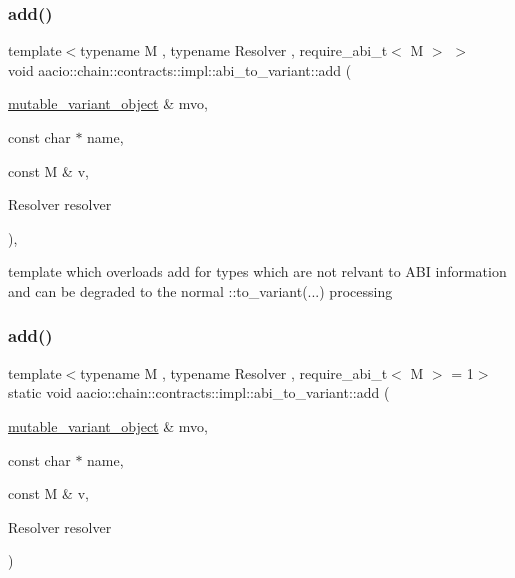 \subsubsection{\texorpdfstring{add()}{add()}\hspace{0.1cm}{\footnotesize\ttfamily [1/5]}}
{\footnotesize\ttfamily template$<$typename M , typename Resolver , require\+\_\+abi\+\_\+t$<$ M $>$ $>$ \\
void aacio\+::chain\+::contracts\+::impl\+::abi\+\_\+to\+\_\+variant\+::add (\begin{DoxyParamCaption}\item[{\mbox{\hyperlink{classfc_1_1mutable__variant__object}{mutable\+\_\+variant\+\_\+object}} \&}]{mvo,  }\item[{const char $\ast$}]{name,  }\item[{const M \&}]{v,  }\item[{Resolver}]{resolver }\end{DoxyParamCaption})\hspace{0.3cm}{\ttfamily [inline]}, {\ttfamily [static]}}

template which overloads add for types which are not relvant to A\+BI information and can be degraded to the normal \+::to\+\_\+variant(...) processing \mbox{\label{structaacio_1_1chain_1_1contracts_1_1impl_1_1abi__to__variant_ad54bf1f05dd90f1b2ac21588f6b09578}} 
\subsubsection{\texorpdfstring{add()}{add()}\hspace{0.1cm}{\footnotesize\ttfamily [2/5]}}
{\footnotesize\ttfamily template$<$typename M , typename Resolver , require\+\_\+abi\+\_\+t$<$ M $>$  = 1$>$ \\
static void aacio\+::chain\+::contracts\+::impl\+::abi\+\_\+to\+\_\+variant\+::add (\begin{DoxyParamCaption}\item[{\mbox{\hyperlink{classfc_1_1mutable__variant__object}{mutable\+\_\+variant\+\_\+object}} \&}]{mvo,  }\item[{const char $\ast$}]{name,  }\item[{const M \&}]{v,  }\item[{Resolver}]{resolver }\end{DoxyParamCaption})\hspace{0.3cm}{\ttfamily [static]}}

